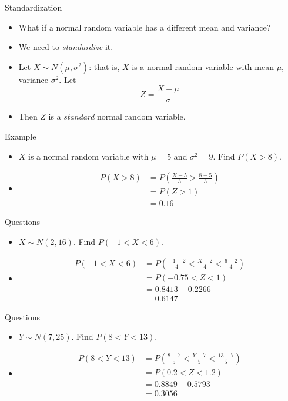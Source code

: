 \documentclass[10pt, handout, xcolor=table]{beamer}
\begin{document}
\begin{frame}{Standardization}
\begin{itemize}
\setlength{\itemsep}{20pt}
\item<1-> What if a normal random variable has a different mean and variance?
\item<2-> We need to \emph{standardize} it. 
\item<3-> Let $X \sim N(\mu, \sigma^2)$: that is, $X$ is a normal random variable with mean $\mu$, variance $\sigma^2$. Let
$$Z = \frac{X - \mu}{\sigma}$$
\item<4-> Then $Z$ is a \emph{standard} normal random variable.
\end{itemize}
\end{frame}

\begin{frame}{Example}
\begin{itemize}
\item<1-> $X$ is a normal random variable with $\mu = 5$ and $\sigma^2 = 9$. Find $P(X > 8)$.
\item<2->[] {\color{red}
\begin{align*}
P(X > 8) &= P\left( \frac{X-5}{3} > \frac{8 - 5}{3}\right)\\
&= P(Z > 1) \\
&= 0.16
\end{align*}}
\end{itemize}
\end{frame}

\begin{frame}{Questions}
\begin{itemize}
\item<1-> $X \sim N(2, 16)$. Find $P(-1 < X < 6)$.
\item<2->[] \color{red}
\begin{align*}
P(-1 < X < 6 ) &= P\left(\frac{-1-2}{4} < \frac{X - 2}{4} < \frac{6 - 2}{4}\right) \\
&= P(-0.75 < Z < 1) \\
&= 0.8413 - 0.2266 \\
&= 0.6147
\end{align*} 
\end{itemize}
\end{frame}

\begin{frame}{Questions}
\begin{itemize}
\item<1-> $Y \sim N(7, 25)$. Find $P(8 < Y < 13)$.
\item<2->[] \color{red}
\begin{align*}
P(8 < Y < 13 )&= P\left(\frac{8 - 7}{5} < \frac{Y -7}{5}< \frac{13 - 7}{5}\right) \\
&= P(0.2 < Z < 1.2)\\
&= 0.8849 - 0.5793 \\
&= 0.3056
\end{align*}
\end{itemize}
\end{frame}
\end{document}
